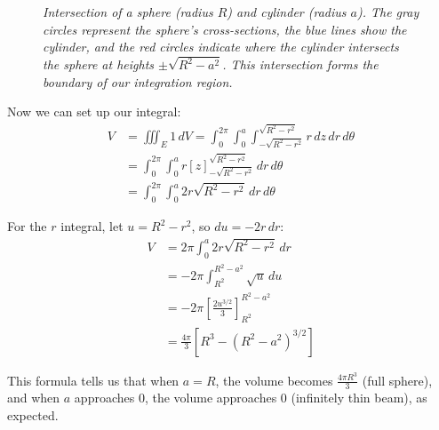 \begin{example}
\begin{solution}
\begin{figure}[H]
\caption{\textit{Intersection of a sphere (radius $R$) and cylinder (radius $a$). The gray circles represent the sphere's cross-sections, the blue lines show the cylinder, and the red circles indicate where the cylinder intersects the sphere at heights $\pm\sqrt{R^2-a^2}$. This intersection forms the boundary of our integration region.}}
\label{fig:cylinder_sphere}
\end{figure}

\noindent Now we can set up our integral:
\begin{align*}
V &= \iiint_E 1\,dV = \int_0^{2\pi}\int_0^a\int_{-\sqrt{R^2-r^2}}^{\sqrt{R^2-r^2}} r\,dz\,dr\,d\theta \\[1ex]
&= \int_0^{2\pi}\int_0^a r\left[z\right]_{-\sqrt{R^2-r^2}}^{\sqrt{R^2-r^2}}\,dr\,d\theta \\[1ex]
&= \int_0^{2\pi}\int_0^a 2r\sqrt{R^2-r^2}\,dr\,d\theta
\end{align*}

\noindent For the $r$ integral, let $u = R^2 - r^2$, so $du = -2r\,dr$:
\begin{align*}
V &= 2\pi\int_0^a 2r\sqrt{R^2-r^2}\,dr \\[1ex]
&= -2\pi\int_{R^2}^{R^2-a^2} \sqrt{u}\,du \\[1ex]
&= -2\pi\left[\frac{2u^{3/2}}{3}\right]_{R^2}^{R^2-a^2} \\[1ex]
&= \frac{4\pi}{3}\left[R^3 - (R^2-a^2)^{3/2}\right]
\end{align*}

\noindent This formula tells us that when $a = R$, the volume becomes $\frac{4\pi R^3}{3}$ (full sphere), and when $a$ approaches 0, the volume approaches 0 (infinitely thin beam), as expected.
\end{solution}
\end{example}
\exampleline

